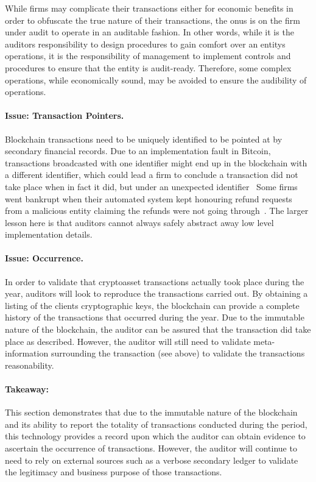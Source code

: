 While firms may complicate their transactions either for economic benefits in order to obfuscate the true nature of their transactions, the onus is on the firm under audit to operate in an auditable fashion. In other words, while it is the auditor\textquotesingle s responsibility to design procedures to gain comfort over an entity\textquotesingle s operations, it is the responsibility of management to implement controls and procedures to ensure that the entity is audit-ready. Therefore, some complex operations, while economically sound, may be avoided to ensure the audibility of operations. 

\paragraph{Issue: Transaction Pointers.} Blockchain transactions need to be uniquely identified to be pointed at by secondary financial records. Due to an implementation fault in Bitcoin, transactions broadcasted with one identifier might end up in the blockchain with a different identifier, which could lead a firm to conclude a transaction did not take place when in fact it did, but under an unexpected identifier~\cite{andrychowicz2015malleability} Some firms went bankrupt when their automated system kept honouring refund requests from a malicious entity claiming the refunds were not going through~\cite{trautman2014virtual,decker2014bitcoin}. The larger lesson here is that auditors cannot always safely abstract away low level implementation details.   

\paragraph{Issue: Occurrence.} In order to validate that cryptoasset transactions actually took place during the year, auditors will look to reproduce the transactions carried out. By obtaining a listing of the client\textquotesingle s cryptographic keys, the blockchain can provide a complete history of the transactions that occurred during the year. Due to the immutable nature of the blockchain, the auditor can be assured that the transaction did take place as described. However, the auditor will still need to validate meta-information surrounding the transaction (see above) to validate the transaction\textquotesingle s reasonability. 

\paragraph{Takeaway:} This section demonstrates that due to the immutable nature of the blockchain and its ability to report the totality of transactions conducted during the period, this technology provides a record upon which the auditor can obtain evidence to ascertain the occurrence of transactions. However, the auditor will continue to need to rely on external sources such as a verbose secondary ledger to validate the legitimacy and business purpose of those transactions. 


